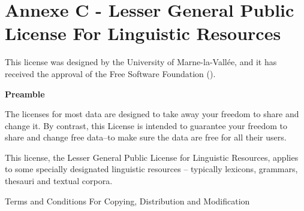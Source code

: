 \chapter*{Annexe C - Lesser General Public License For Linguistic Resources}
\noindent
This license was designed by the University of Marne-la-Vall\'ee, and it has
received the approval of the Free Software Foundation (\cite{FSF}).

\bigskip

\bigskip

\begin{center}
{\bf\large Preamble}
\end{center}

The licenses for most data are designed to take away your freedom to share and change it. 
By contrast, this License is intended to guarantee your freedom to share and change free 
data--to make sure the data are free for all their users.

This license, the Lesser General Public License for Linguistic Resources, applies to some 
specially designated linguistic resources -- typically lexicons, grammars, thesauri and 
textual corpora.

\begin{center}
{\Large \sc Terms and Conditions For Copying, Distribution and Modification}
\end{center}


